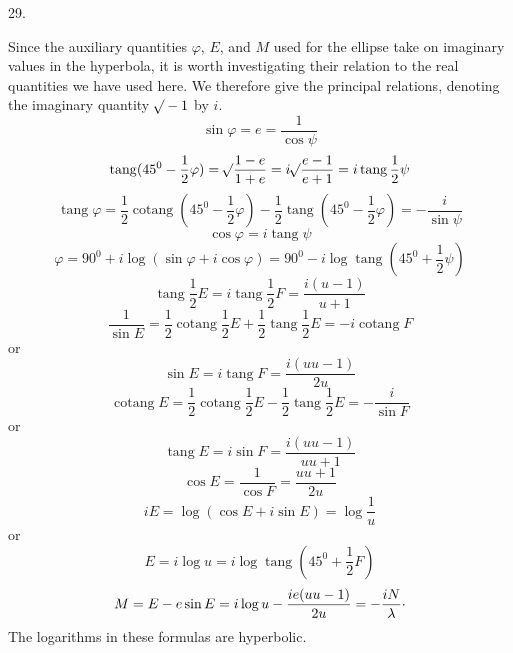 \par{}
\begin{center}
29.
\end{center}
Since the auxiliary quantities $\varphi$, $E$, and $M$ used for the ellipse take on imaginary values in the hyperbola, it is worth investigating their relation to the real quantities we have used here. We therefore give the principal relations, denoting the imaginary quantity $\mathord{{}^{}\!\surd}-1$ by $i$.
\[
\sin\varphi=e=\frac{1}{\cos\psi}
\]
\[
\operatorname{tang}(45^0-\frac{1}{2}\varphi)=\mathord{{}^{}\!\surd}\frac{1-e}{1+e}=i\mathord{{}^{}\!\surd}\frac{e-1}{e+1}=i\operatorname{tang}\frac{1}{2}\psi
\]
\[
\operatorname{tang}\varphi=\frac{1}{2}\operatorname{cotang}(45^0-\frac{1}{2}\varphi)-\frac{1}{2}\operatorname{tang}(45^0-\frac{1}{2}\varphi)=-\frac{i}{\sin\psi}
\]
\[
\cos\varphi=i\operatorname{tang}\psi
\]
\[
\varphi=90^0+i\log(\sin\varphi+i\cos\varphi)=90^0-i\log\operatorname{tang}(45^0+\frac{1}{2}\psi)
\]
\[
\operatorname{tang}\frac{1}{2}E=i\operatorname{tang}\frac{1}{2}F=\frac{i(u-1)}{u+1}
\]
\[
\frac{1}{\sin E}=\frac{1}{2}\operatorname{cotang}\frac{1}{2}E+\frac{1}{2}\operatorname{tang}\frac{1}{2}E=-i\operatorname{cotang}F
\]
or
\[
\sin E=i\operatorname{tang}F=\frac{i(uu-1)}{2u}
\]
\[
\operatorname{cotang}E=\frac{1}{2}\operatorname{cotang}\frac{1}{2}E-\frac{1}{2}\operatorname{tang}\frac{1}{2}E=-\frac{i}{\sin F}
\]
or
\[
\operatorname{tang}E=i\sin F=\frac{i(uu-1)}{uu+1}
\]
\[
\cos E=\frac{1}{\cos F}=\frac{uu+1}{2u}
\]
\[
iE=\log(\cos E+i\sin E)=\log\frac{1}{u}
\]
or
\[
E=i\log u=i\log\operatorname{tang}(45^0+\frac{1}{2}F)
\]
\[
M=E-e\sin E=i\log u-\frac{ie(uu-1)}{2u}=-\frac{iN}{\lambda}\raisebox{.45ex}{.}
\]
The logarithms in these formulas are hyperbolic.
